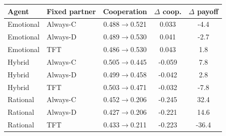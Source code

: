 \begin{tabular}{llccc}
\toprule
Agent & Fixed partner & Cooperation & $\Delta$ coop. & $\Delta$ payoff \\ 
\midrule
Emotional & Always-C & 0.488$\to$0.521 & 0.033 & -4.4 \\ 
Emotional & Always-D & 0.489$\to$0.530 & 0.041 & -2.7 \\ 
Emotional & TFT & 0.486$\to$0.530 & 0.043 & 1.8 \\ 
\midrule
Hybrid & Always-C & 0.505$\to$0.445 & -0.059 & 7.8 \\ 
Hybrid & Always-D & 0.499$\to$0.458 & -0.042 & 2.8 \\ 
Hybrid & TFT & 0.503$\to$0.471 & -0.032 & -7.8 \\ 
\midrule
Rational & Always-C & 0.452$\to$0.206 & -0.245 & 32.4 \\ 
Rational & Always-D & 0.427$\to$0.206 & -0.221 & 14.6 \\ 
Rational & TFT & 0.433$\to$0.211 & -0.223 & -36.4 \\ 
\bottomrule
\end{tabular}

